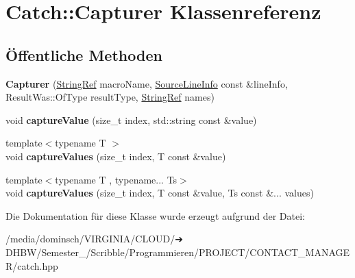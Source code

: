 \hypertarget{classCatch_1_1Capturer}{}\section{Catch\+:\+:Capturer Klassenreferenz}
\label{classCatch_1_1Capturer}
\subsection*{Öffentliche Methoden}
\begin{DoxyCompactItemize}
\item 
\mbox{\label{classCatch_1_1Capturer_a86b0b27acc803a4e1310c10820f3038f}} 
{\bfseries Capturer} (\hyperlink{classCatch_1_1StringRef}{String\+Ref} macro\+Name, \hyperlink{structCatch_1_1SourceLineInfo}{Source\+Line\+Info} const \&line\+Info, Result\+Was\+::\+Of\+Type result\+Type, \hyperlink{classCatch_1_1StringRef}{String\+Ref} names)
\item 
\mbox{\label{classCatch_1_1Capturer_a0695ebf77f7cdcb344c73bcb3d9131e4}} 
void {\bfseries capture\+Value} (size\+\_\+t index, std\+::string const \&value)
\item 
\mbox{\label{classCatch_1_1Capturer_a60d08e6db2e54740bb2298bbbec3bc0b}} 
{\footnotesize template$<$typename T $>$ }\\void {\bfseries capture\+Values} (size\+\_\+t index, T const \&value)
\item 
\mbox{\label{classCatch_1_1Capturer_a76f2a097cfeb3042688300b81eb9bcbc}} 
{\footnotesize template$<$typename T , typename... Ts$>$ }\\void {\bfseries capture\+Values} (size\+\_\+t index, T const \&value, Ts const \&... values)
\end{DoxyCompactItemize}


Die Dokumentation für diese Klasse wurde erzeugt aufgrund der Datei\+:\begin{DoxyCompactItemize}
\item 
/media/dominsch/\+V\+I\+R\+G\+I\+N\+I\+A/\+C\+L\+O\+U\+D/➔ D\+H\+B\+W/\+Semester\+\_/\+Scribble/\+Programmieren/\+P\+R\+O\+J\+E\+C\+T/\+C\+O\+N\+T\+A\+C\+T\+\_\+\+M\+A\+N\+A\+G\+E\+R/catch.\+hpp\end{DoxyCompactItemize}
